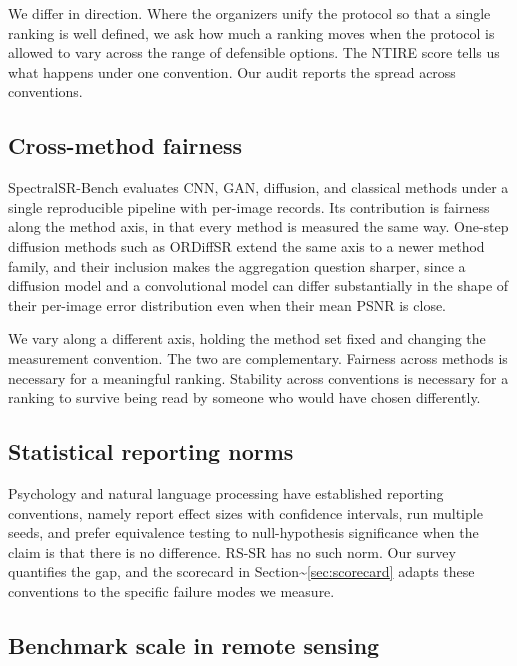 \documentclass[pdflatex,sn-nature]{sn-jnl}
\begin{document}
We differ in direction. Where the organizers unify the protocol so that a single ranking is well defined, we ask how much a ranking moves when the protocol is allowed to vary across the range of defensible options. The NTIRE score tells us what happens under one convention. Our audit reports the spread across conventions.

\subsection{Cross-method fairness}\label{sec:fairness}

SpectralSR-Bench \cite{ref6} evaluates CNN, GAN, diffusion, and classical methods under a single reproducible pipeline with per-image records. Its contribution is fairness along the method axis, in that every method is measured the same way. One-step diffusion methods such as ORDiffSR \cite{ref7} extend the same axis to a newer method family, and their inclusion makes the aggregation question sharper, since a diffusion model and a convolutional model can differ substantially in the shape of their per-image error distribution even when their mean PSNR is close.

We vary along a different axis, holding the method set fixed and changing the measurement convention. The two are complementary. Fairness across methods is necessary for a meaningful ranking. Stability across conventions is necessary for a ranking to survive being read by someone who would have chosen differently.

\subsection{Statistical reporting norms}\label{sec:reporting}

Psychology and natural language processing have established reporting conventions, namely report effect sizes with confidence intervals, run multiple seeds, and prefer equivalence testing to null-hypothesis significance when the claim is that there is no difference. RS-SR has no such norm. Our survey quantifies the gap, and the scorecard in Section\textasciitilde{}\ref{sec:scorecard} adapts these conventions to the specific failure modes we measure.

\subsection{Benchmark scale in remote sensing}\label{sec:scale}
\end{document}
